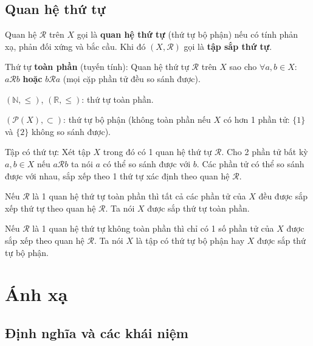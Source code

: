 \documentclass[12pt,a4paper]{article}
\begin{document}
\subsection{Quan hệ thứ tự}

\begin{dinhnghia}
  Quan hệ $\mathcal{R}$ trên $X$ gọi là \textbf{quan hệ thứ tự} (thứ tự bộ phận) nếu có tính phản xạ, phản đối xứng và bắc cầu. Khi đó $(X, \mathcal{R})$ gọi là \textbf{tập sắp thứ tự}.
\end{dinhnghia}

\begin{dinhnghia}
  Thứ tự \textbf{toàn phần} (tuyến tính): Quan hệ thứ tự $\mathcal{R}$ trên $X$ sao cho $\forall a, b \in X$: $a \mathcal{R} b$ \textbf{hoặc} $b \mathcal{R} a$ (mọi cặp phần tử đều so sánh được).
\end{dinhnghia}

\begin{vidu}
  $(\mathbb{N}, \le)$, $(\mathbb{R}, \le)$: thứ tự toàn phần. 
  
  $(\mathcal{P}(X), \subset)$: thứ tự bộ phận (không toàn phần nếu $X$ có hơn 1 phần tử: $\{1\}$ và $\{2\}$ không so sánh được).
\end{vidu}

\begin{dinhnghia}
    Tập có thứ tự: Xét tập $X$ trong đó có 1 quan hệ thứ tự $\mathcal{R}$. Cho 2 phần tử bất kỳ $a, b \in X$ nếu $a \mathcal{R} b$ ta nói $a$ có thể so sánh được với $b$. Các phần tử có thể so sánh được với nhau, sắp xếp theo 1 thứ tự xác định theo quan hệ $\mathcal{R}$.

    Nếu $\mathcal{R}$ là 1 quan hệ thứ tự toàn phần thì tất cả các phần tử của $X$ đều được sắp xếp thứ tự theo quan hệ $\mathcal{R}$. Ta nói $X$ được sắp thứ tự toàn phần.

    Nếu $\mathcal{R}$ là 1 quan hệ thứ tự không toàn phần thì chỉ có 1 số phần tử của $X$ được sắp xếp theo quan hệ $\mathcal{R}$. Ta nói $X$ là tập có thứ tự bộ phận hay $X$ được sắp thứ tự bộ phận.
\end{dinhnghia}

\section{Ánh xạ}

\subsection{Định nghĩa và các khái niệm}
\end{document}

